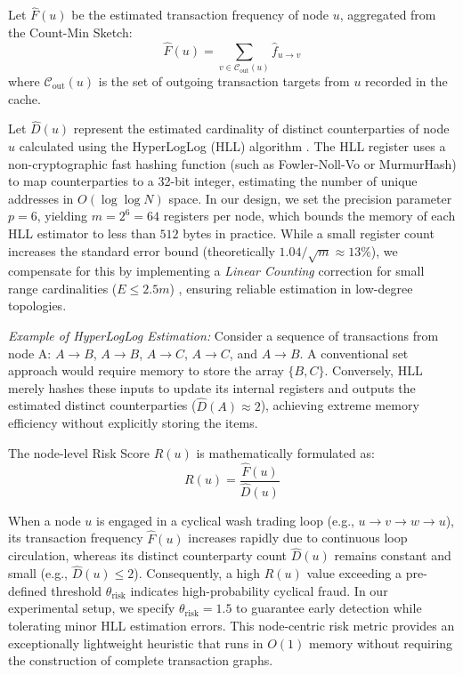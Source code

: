 \documentclass[conference]{IEEEtran}
\begin{document}
Let $\hat{F}(u)$ be the estimated transaction frequency of node $u$, aggregated from the Count-Min Sketch:
\begin{equation}
\hat{F}(u) = \sum_{v \in \mathcal{C}_{\text{out}}(u)} \hat{f}_{u \to v}
\end{equation}
where $\mathcal{C}_{\text{out}}(u)$ is the set of outgoing transaction targets from $u$ recorded in the cache.

Let $\hat{D}(u)$ represent the estimated cardinality of distinct counterparties of node $u$ calculated using the HyperLogLog (HLL) algorithm \cite{b4}. The HLL register uses a non-cryptographic fast hashing function (such as Fowler-Noll-Vo or MurmurHash) to map counterparties to a 32-bit integer, estimating the number of unique addresses in $O(\log \log N)$ space. In our design, we set the precision parameter $p=6$, yielding $m=2^6=64$ registers per node, which bounds the memory of each HLL estimator to less than $512$ bytes in practice. While a small register count increases the standard error bound (theoretically $1.04/\sqrt{m} \approx 13\%$), we compensate for this by implementing a \textit{Linear Counting} correction for small range cardinalities ($E \le 2.5 m$) \cite{b5}, ensuring reliable estimation in low-degree topologies.

\textit{Example of HyperLogLog Estimation:} Consider a sequence of transactions from node A: $A \to B$, $A \to B$, $A \to C$, $A \to C$, and $A \to B$. A conventional set approach would require memory to store the array $\{B, C\}$. Conversely, HLL merely hashes these inputs to update its internal registers and outputs the estimated distinct counterparties ($\hat{D}(A) \approx 2$), achieving extreme memory efficiency without explicitly storing the items.

The node-level Risk Score $R(u)$ is mathematically formulated as:
\begin{equation}
R(u) = \frac{\hat{F}(u)}{\hat{D}(u)}
\end{equation}

When a node $u$ is engaged in a cyclical wash trading loop (e.g., $u \to v \to w \to u$), its transaction frequency $\hat{F}(u)$ increases rapidly due to continuous loop circulation, whereas its distinct counterparty count $\hat{D}(u)$ remains constant and small (e.g., $\hat{D}(u) \le 2$). Consequently, a high $R(u)$ value exceeding a pre-defined threshold $\theta_{\text{risk}}$ indicates high-probability cyclical fraud. In our experimental setup, we specify $\theta_{\text{risk}} = 1.5$ to guarantee early detection while tolerating minor HLL estimation errors. This node-centric risk metric provides an exceptionally lightweight heuristic that runs in $O(1)$ memory without requiring the construction of complete transaction graphs.
\end{document}
